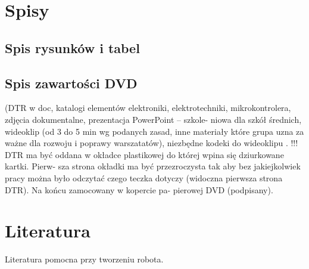 \documentclass[11pt,a4paper]{article}
\begin{document}
\section{Spisy}
\subsection{Spis rysunków i tabel} 
\subsection{Spis zawartości DVD} (DTR w doc, katalogi elementów elektroniki,
elektrotechniki, mikrokontrolera, zdjęcia dokumentalne, prezentacja PowerPoint – szkole-
niowa dla szkół średnich, wideoklip (od 3 do 5 min wg podanych zasad, inne materiały które
grupa uzna za ważne dla rozwoju i poprawy warszatatów), niezbędne kodeki do wideoklipu .
!!! DTR ma być oddana w okładce plastikowej do której wpina się dziurkowane kartki. Pierw-
sza strona okładki ma być przezroczysta tak aby bez jakiejkolwiek pracy można było odczytać
czego teczka dotyczy (widoczna pierwsza strona DTR). Na końcu zamocowany w kopercie pa-
pierowej DVD (podpisany). 

\section{Literatura}
Literatura pomocna przy tworzeniu robota.
\end{document}
